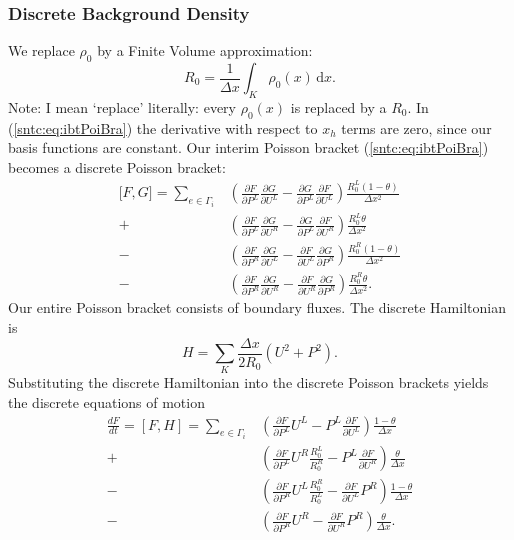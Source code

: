 \documentclass{article}
\begin{document}
\subsubsection{Discrete Background Density}
We replace $\rho_0$ by a Finite Volume approximation:
\begin{equation}
	R_0 = \frac{1}{\Delta x} \int_K \! \rho_0(x) \, \mathrm{d}x.
\end{equation}
Note: I mean `replace' literally: every $\rho_0(x)$ is replaced by a $R_0$. In (\ref{sntc:eq:ibtPoiBra}) the derivative with respect to $x_h$ terms are zero, since our basis functions are constant. Our interim Poisson bracket (\ref{sntc:eq:ibtPoiBra}) becomes a discrete Poisson bracket:
\begin{equation}
	\begin{aligned}
		{[}F, G{]} = \sum_{e\in\Gamma_i} & \left( \frac{\partial F}{\partial P^L} \frac{\partial G}{\partial U^L}- \frac{\partial G}{\partial P^L} \frac{\partial F}{\partial U^L} \right) \frac{R_0^L (1-\theta)}{\Delta x^2} \\
	+ & \left( \frac{\partial F}{\partial P^L} \frac{\partial G}{\partial U^R}- \frac{\partial G}{\partial P^L} \frac{\partial F}{\partial U^R} \right) \frac{R_0^L \theta}{\Delta x^2} \\
	- &\left( \frac{\partial F}{\partial P^R} \frac{\partial G}{\partial U^L} - \frac{\partial F}{\partial U^L} \frac{\partial G}{\partial P^R}\right) \frac{R_0^R (1-\theta)}{\Delta x^2} \\
	- &\left( \frac{\partial F}{\partial P^R} \frac{\partial G}{\partial U^R} - \frac{\partial F}{\partial U^R} \frac{\partial G}{\partial P^R}\right) \frac{R_0^R \theta}{\Delta x^2}.	
	\end{aligned}
\end{equation}
Our entire Poisson bracket consists of boundary fluxes. The discrete Hamiltonian 
 is
\begin{equation}
	H = \sum_K \frac{\Delta x }{2 R_0} \left(U^2 + P^2\right).
\end{equation}
Substituting the discrete Hamiltonian into the discrete Poisson brackets yields the discrete equations of motion
\begin{equation}
	\begin{aligned}
		\frac{d F}{d t} = [F, H] = \sum_{e\in\Gamma_i} 
	  & \left( \frac{\partial F}{\partial P^L} U^L- P^L \frac{\partial F}{\partial U^L} \right) \frac{1-\theta}{\Delta x} \\
	+ & \left( \frac{\partial F}{\partial P^L} U^R \frac{R_0^L}{R_0^R}- P^L \frac{\partial F}{\partial U^R} \right) \frac{\theta}{\Delta x} \\
	- &\left( \frac{\partial F}{\partial P^R} U^L \frac{R_0^R}{R_0^L} - \frac{\partial F}{\partial U^L} P^R\right) \frac{1-\theta}{\Delta x} \\
	- &\left( \frac{\partial F}{\partial P^R} U^R - \frac{\partial F}{\partial U^R} P^R\right) \frac{\theta}{\Delta x}.	
	\end{aligned}
\end{equation}
\end{document}
